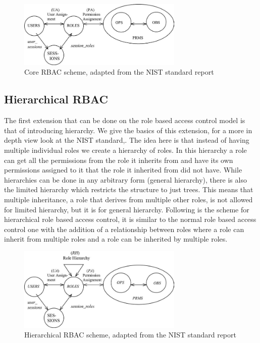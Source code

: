 \begin{figure}[ht]
    \centering
    \includegraphics[width=0.7\textwidth, height=0.4\textwidth]{Img/standard/coreRBAC.jpg}
    \caption{Core RBAC scheme, adapted from the NIST standard report\cite{Standard}}
\end{figure}

\subsection{Hierarchical RBAC}
The first extension that can be done on the role based access control model is that of introducing hierarchy.
We give the basics of this extension, for a more in depth view look at the NIST standard\cite{Hierarch},\cite{Standard}.
The idea here is that instead of having multiple individual roles we create a hierarchy of roles.
In this hierarchy a role can get all the permissions from the role it inherits from and have its own permissions assigned to it that the role it inherited from did not have.
While hierarchies can be done in any arbitrary form (general hierarchy), there is also the limited hierarchy which restricts the structure to just trees.
This means that multiple inheritance, a role that derives from multiple other roles, is not allowed for limited hierarchy, but it is for general hierarchy.
Following is the scheme for hierarchical role based access control, it is similar to the normal role based access control one with the addition of a relationship between roles where a role can inherit from multiple roles and a role can be inherited by multiple roles.

\begin{figure}[ht]
    \centering
    \includegraphics[width=0.7\textwidth, height=0.40\textwidth]{Img/standard/hierarchRBAC.jpg}
    \caption{Hierarchical RBAC scheme, adapted from the NIST standard report\cite{Standard}}
\end{figure}

